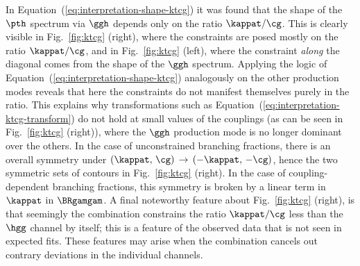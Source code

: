 In Equation~(\ref{eq:interpretation-shape-ktcg}) it was found that the shape of the $\pth$ spectrum via $\ggh$ depends only on the ratio $\kappat/\cg$.
% 
This is clearly visible in Fig.~\ref{fig:ktcg} (right), where the constraints are posed mostly on the ratio $\kappat / \cg$, and in Fig.~\ref{fig:ktcg} (left), where the constraint \emph{along} the diagonal comes from the shape of the $\ggh$ spectrum.
% 
Applying the logic of Equation~(\ref{eq:interpretation-shape-ktcg}) analogously on the other production modes reveals that here the constraints do not manifest themselves purely in the ratio.
% 
This explains why transformations such as Equation~(\ref{eq:interpretation-ktcg-transform}) do not hold at small values of the couplings (as can be seen in Fig.~\ref{fig:ktcg} (right)), where the $\ggh$ production mode is no longer dominant over the others.
% 
In the case of unconstrained branching fractions, there is an overall symmetry under $(\kappat,\,\cg) \, \to \, (-\kappat,\,-\cg)$, hence the two symmetric sets of contours in Fig.~\ref{fig:ktcg} (right).
% 
In the case of coupling-dependent branching fractions, this symmetry is broken by a linear term in $\kappat$ in $\BRgamgam$.
% 
A final noteworthy feature about Fig.~\ref{fig:ktcg} (right), is that seemingly the combination constrains the ratio $\kappat / \cg$ less than the $\hgg$ channel by itself; this is a feature of the observed data that is not seen in expected fits.
% 
These features may arise when the combination cancels out contrary deviations in the individual channels.


